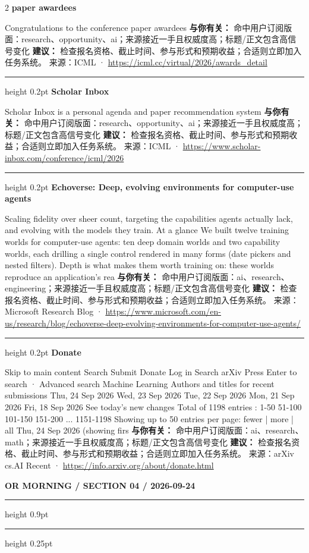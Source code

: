 \documentclass[10.5pt]{ctexart}
\begin{document}
\begin{multicols}{2}
{\large\bfseries paper awardees}\par
Congratulations to the conference paper awardees
\textbf{与你有关：} 命中用户订阅版面：research、opportunity、ai；来源接近一手且权威度高；标题/正文包含高信号变化
\textbf{建议：} 检查报名资格、截止时间、参与形式和预期收益；合适则立即加入任务系统。
{\footnotesize\color{ormuted} 来源：ICML · \url{https://icml.cc/virtual/2026/awards_detail}}
\vspace{2mm}
\hrule height 0.2pt
\vspace{2mm}
{\large\bfseries Scholar Inbox}\par
Scholar Inbox is a personal agenda and paper recommendation system
\textbf{与你有关：} 命中用户订阅版面：research、opportunity、ai；来源接近一手且权威度高；标题/正文包含高信号变化
\textbf{建议：} 检查报名资格、截止时间、参与形式和预期收益；合适则立即加入任务系统。
{\footnotesize\color{ormuted} 来源：ICML · \url{https://www.scholar-inbox.com/conference/icml/2026}}
\vspace{2mm}
\hrule height 0.2pt
\vspace{2mm}
{\large\bfseries Echoverse: Deep, evolving environments for computer-use agents}\par
Scaling fidelity over sheer count, targeting the capabilities agents actually lack, and evolving with the models they train. At a glance We built twelve training worlds for computer-use agents: ten deep domain worlds and two capability worlds, each drilling a single control rendered in many forms (date pickers and nested filters). Depth is what makes them worth training on: these worlds reproduce an application’s rea
\textbf{与你有关：} 命中用户订阅版面：ai、research、engineering；来源接近一手且权威度高；标题/正文包含高信号变化
\textbf{建议：} 检查报名资格、截止时间、参与形式和预期收益；合适则立即加入任务系统。
{\footnotesize\color{ormuted} 来源：Microsoft Research Blog · \url{https://www.microsoft.com/en-us/research/blog/echoverse-deep-evolving-environments-for-computer-use-agents/}}
\vspace{2mm}
\hrule height 0.2pt
\vspace{2mm}
{\large\bfseries Donate}\par
Skip to main content Search Submit Donate Log in Search arXiv Press Enter to search · Advanced search Machine Learning Authors and titles for recent submissions Thu, 24 Sep 2026 Wed, 23 Sep 2026 Tue, 22 Sep 2026 Mon, 21 Sep 2026 Fri, 18 Sep 2026 See today's new changes Total of 1198 entries : 1-50 51-100 101-150 151-200 ... 1151-1198 Showing up to 50 entries per page: fewer | more | all Thu, 24 Sep 2026 (showing firs
\textbf{与你有关：} 命中用户订阅版面：ai、research、math；来源接近一手且权威度高；标题/正文包含高信号变化
\textbf{建议：} 检查报名资格、截止时间、参与形式和预期收益；合适则立即加入任务系统。
{\footnotesize\color{ormuted} 来源：arXiv cs.AI Recent · \url{https://info.arxiv.org/about/donate.html}}
\end{multicols}
\newpage
{\small\bfseries OR MORNING / SECTION 04 / 2026-09-24}
\vspace{2mm}
\hrule height 0.9pt
\vspace{1.5mm}
\hrule height 0.25pt
\vspace{4mm}
\end{document}
